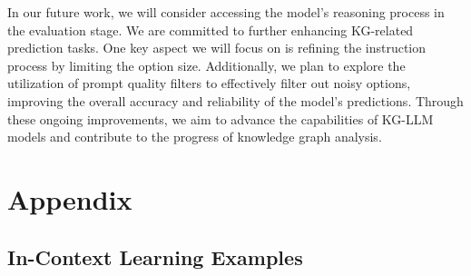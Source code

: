 \documentclass[pmlr]{jmlr}%
\begin{document}
In our future work, we will consider accessing the model's reasoning process in the evaluation stage. We are committed to further enhancing KG-related prediction tasks. One key aspect we will focus on is refining the instruction process by limiting the option size. Additionally, we plan to explore the utilization of prompt quality filters to effectively filter out noisy options, improving the overall accuracy and reliability of the model's predictions. Through these ongoing improvements, we aim to advance the capabilities of KG-LLM models and contribute to the progress of knowledge graph analysis.



%



\newpage

\appendix

\section{Appendix}\label{apd:first}


\subsection{In-Context Learning Examples}
\label{appendix:icl}
\end{document}
